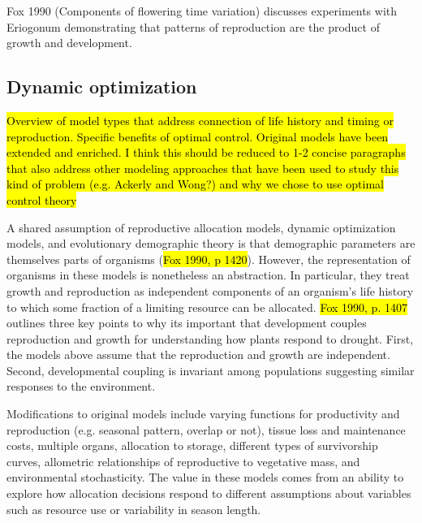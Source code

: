 \documentclass[12pt, oneside]{article}   	%
\begin{document}

Fox 1990 (Components of flowering time variation) discusses experiments with Eriogonum demonstrating that patterns of reproduction are the product of growth and development. 

\subsection{Dynamic optimization}

\hl{Overview of model types that address connection of life history and timing or reproduction. Specific benefits of optimal control. Original models have been extended and enriched. I think this should be reduced to 1-2 concise paragraphs that also address other modeling approaches that have been used to study this kind of problem (e.g. Ackerly and Wong?) and why we chose to use optimal control theory}

A shared assumption of reproductive allocation models, dynamic optimization models, and evolutionary demographic theory is that demographic parameters are themselves parts of organisms (\hl{Fox 1990, p 1420}). However, the representation of organisms in these models is nonetheless an abstraction. In particular, they treat growth and reproduction as independent components of an organism's life history to which some fraction of a limiting resource can be allocated. \hl{Fox 1990, p. 1407} outlines three key points to why its important that development couples reproduction and growth for understanding how plants respond to drought. First, the models above assume that the reproduction and growth are independent. Second, developmental coupling is invariant among populations suggesting similar responses to the environment. 

Modifications to original models include varying functions for productivity and reproduction (e.g. seasonal pattern, overlap or not), tissue loss and maintenance costs, multiple organs, allocation to storage, different types of survivorship curves, allometric relationships of reproductive to vegetative mass, and environmental stochasticity. The value in these models comes from an ability to explore how allocation decisions respond to different assumptions about variables such as resource use or variability in season length. 
\end{document}
